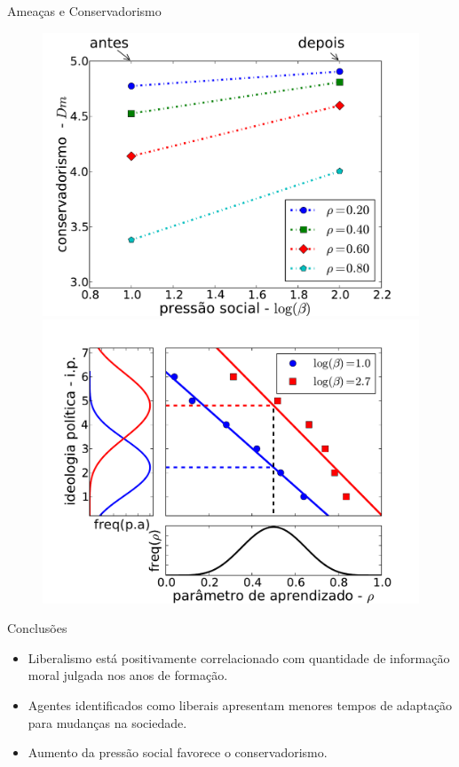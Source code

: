 \documentclass{beamer}
\begin{document}
   \begin{frame}{Ameaças e Conservadorismo}%
       \begin{figure}
           \centering
           \includegraphics[scale=0.25]{Figures/threat.pdf}
           \quad
           \includegraphics[scale=0.25]{Figures/dist-pa-rho.pdf}
       \end{figure}
   \end{frame}%

   \begin{frame}{Conclusões}%
       \begin{itemize}
           \item Liberalismo está positivamente correlacionado com quantidade de
               informação moral julgada nos anos de formação. 
           \item Agentes identificados como liberais apresentam menores tempos
               de adaptação para mudanças na sociedade.
           \item Aumento da pressão social favorece o conservadorismo.
       \end{itemize}

   \end{frame}%


\end{document}
